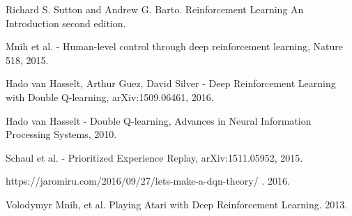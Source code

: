 \documentclass[12p]{article}
\begin{document}
  \begin{thebibliography}{}
      Richard S. Sutton and Andrew G. Barto.
      Reinforcement Learning An Introduction second edition.

      Mnih et al. - Human-level control through deep reinforcement learning, Nature 518, 2015.

     Hado van Hasselt, Arthur Guez, David Silver - Deep Reinforcement Learning with Double Q-learning, arXiv:1509.06461, 2016.

     Hado van Hasselt - Double Q-learning, Advances in Neural Information Processing Systems, 2010.

      Schaul et al. - Prioritized Experience Replay, arXiv:1511.05952, 2015.

      https://jaromiru.com/2016/09/27/lets-make-a-dqn-theory/ . 2016.

      Volodymyr Mnih, et al.
      Playing Atari with Deep Reinforcement Learning. 2013.
  \end{thebibliography}
\end{document}
